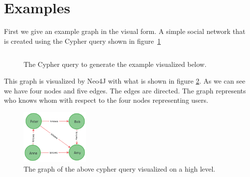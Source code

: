 \documentclass[a4paper,10pt]{article}
\begin{document}
\section{Examples}
    First we give an example graph in the visual form. A simple social network that is created using the Cypher query shown in figure~\ref{ex_q}
    \begin{figure}[htp]\label{ex_q}
        \begin{center}
            \inputminted{Cypher}{code/example_query.cy}
        \end{center}
        \caption{The Cypher query to generate the example visualized below.} %
    \end{figure}
    This graph is visualized by Neo4J with what is shown in figure \ref{graph}. As we can see we have four nodes and five edges. The edges are directed. The graph represents who knows whom with respect to the four nodes representing users.
    \begin{figure}[htp]\label{graph}
        \begin{center}
            \includegraphics[keepaspectratio,height=0.3\textheight,width=0.3\textwidth]{img/04_example/graph.png}
        \end{center}
        \caption{The graph of the above cypher query visualized on a high level.} %
    \end{figure}
    
\end{document}
